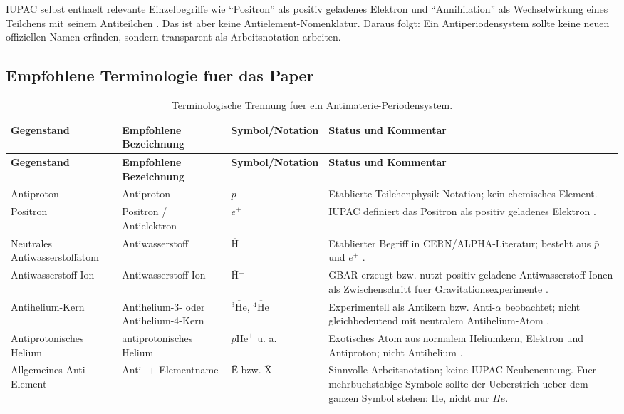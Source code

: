 \documentclass[11pt,a4paper]{article}
\newcommand{\anti}[1]{\ensuremath{\overline{\mathrm{#1}}}}
\newcommand{\ap}{\ensuremath{\bar p}}
\newcommand{\ep}{\ensuremath{e^+}}
\begin{document}
IUPAC selbst enthaelt relevante Einzelbegriffe wie \enquote{Positron} als positiv geladenes Elektron \cite{IUPACpositron} und \enquote{Annihilation} als Wechselwirkung eines Teilchens mit seinem Antiteilchen \cite{IUPACannihilation}. Das ist aber keine Antielement-Nomenklatur. Daraus folgt: Ein Antiperiodensystem sollte keine neuen offiziellen Namen erfinden, sondern transparent als Arbeitsnotation arbeiten.

\subsection{Empfohlene Terminologie fuer das Paper}

\begin{longtable}{p{}p{}p{}p{}}
\caption{Terminologische Trennung fuer ein Antimaterie-Periodensystem.}\label{tab:nomenclature}\\
\toprule
\textbf{Gegenstand} & \textbf{Empfohlene Bezeichnung} & \textbf{Symbol/Notation} & \textbf{Status und Kommentar}\\
\midrule
\endfirsthead
\toprule
\textbf{Gegenstand} & \textbf{Empfohlene Bezeichnung} & \textbf{Symbol/Notation} & \textbf{Status und Kommentar}\\
\midrule
\endhead
Antiproton & Antiproton & \ap & Etablierte Teilchenphysik-Notation; kein chemisches Element.\\
Positron & Positron / Antielektron & \ep & IUPAC definiert das Positron als positiv geladenes Elektron \cite{IUPACpositron}.\\
Neutrales Antiwasserstoffatom & Antiwasserstoff & \anti{H} & Etablierter Begriff in CERN/ALPHA-Literatur; besteht aus \ap{} und \ep{} \cite{CERNstoring}.\\
Antiwasserstoff-Ion & Antiwasserstoff-Ion & \anti{H}$^{+}$ & GBAR erzeugt bzw. nutzt positiv geladene Antiwasserstoff-Ionen als Zwischenschritt fuer Gravitationsexperimente \cite{CERNGBAR}.\\
Antihelium-Kern & Antihelium-3- oder Antihelium-4-Kern & $\overline{{}^{3}\mathrm{He}}$, $\overline{{}^{4}\mathrm{He}}$ & Experimentell als Antikern bzw. Anti-$\alpha$ beobachtet; nicht gleichbedeutend mit neutralem Antihelium-Atom \cite{STAR2011}.\\
Antiprotonisches Helium & antiprotonisches Helium & $\bar p\mathrm{He}^{+}$ u. a. & Exotisches Atom aus normalem Heliumkern, Elektron und Antiproton; nicht Antihelium \cite{Hori2011}.\\
Allgemeines Anti-Element & Anti- + Elementname & \anti{E} bzw. \anti{X} & Sinnvolle Arbeitsnotation; keine IUPAC-Neubenennung. Fuer mehrbuchstabige Symbole sollte der Ueberstrich ueber dem ganzen Symbol stehen: \anti{He}, nicht nur $\bar H e$.\\
\bottomrule
\end{longtable}
\end{document}
